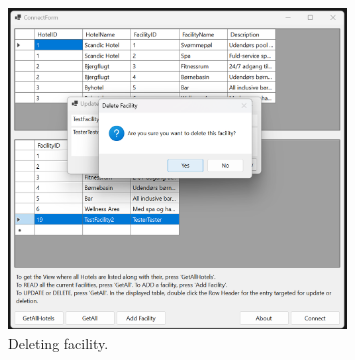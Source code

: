 \begin{figure}
    \centering
    \includegraphics[width=0.8\textwidth]{figures/app-screenshots/11deleteprompt.png}
    \caption{Deleting facility.}
    \label{fig:11deleteprompt}
\end{figure}